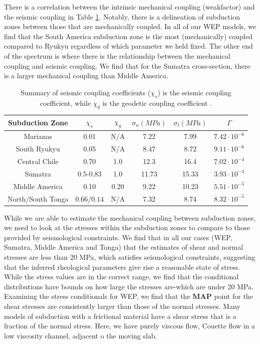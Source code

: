 \documentclass[12pt]{article}
\begin{document}
{There is a correlation between the intrinsic mechanical coupling (weakfactor) and the seismic coupling in Table \ref{table:coupling_summary}. Notably, there is a delineation of subduction zones between those that are mechanically coupled. In all of our WEP models, we find that the South America subduction zone is the most (mechanically) coupled compared to Ryukyu regardless of which parameter we held fixed. The other end of the spectrum is where there is the relationship between the mechanical coupling and seismic coupling. We find that for the Sumatra cross-section, there is a larger mechanical coupling than Middle America.
   
   \begin{table}[H]
  \caption{Summary of seismic coupling coefficients ($\chi_s$) is the seismic coupling coefficient, while $\chi_g$ is the geodetic coupling coefficient \citep{scholz2012seismic}.} %
  \centering  %
  \begin{tabular}{c c c c c c} %
    \hline \hline                        %
    Subduction Zone & $\chi_s$ & $\chi_g$ & $\sigma_n (MPa)$ & $\sigma_t (MPa)$ & $\Gamma$ \\ [0.5ex] %
    \hline                  %
    Marianas &0.01 &N/A &7.22 &7.99 & $7.42 \cdot 10^{-6}$\\
    South Ryukyu  &0.05 &N/A &8.47&8.72 & $9.11 \cdot 10^{-6}$\\
    Central Chile &0.70 &1.0 &12.3 &16.4 & $7.02 \cdot 10^{-4}$ \\
    Sumatra &0.5-0.83 &1.0 &11.73 & 15.33 &$3.93 \cdot 10^{-4}$\\
    Middle America &0.10 &0.20 &9.22 & 10.23 & $5.51 \cdot 10^{-5}$ \\
    North$/$South Tonga & $0.66/0.14$ &N/A &7.32 & 8.74 & $8.32 \cdot 10^{-5}$ \\
    \hline %
  \end{tabular}
  \label{table:coupling_summary} %
\end{table}

   
   While we are able to estimate the mechanical coupling between subduction zones, we need to look at the stresses within the subduction zones to compare to those provided by seismological constraints. We find that in all our cases (WEP, Sumatra, Middle America and Tonga) that the estimates of shear and normal stresses are less than 20 MPa, which satisfies seismological constraints, suggesting that the inferred rheological parameters give rise a reasonable state of stress. While the stress values are in the correct range, we find that the conditional distributions have bounds on how large the stresses are-which are under 20 MPa. Examining the stress conditionals for WEP, we find that the \textbf{MAP} point for the shear stresses are consistently larger than those of the normal stresses. 
Many models of subduction with a frictional material have a shear stress that is a fraction of the normal stress.
Here, we have purely viscous flow, Couette flow in a low viscosity  channel, adjacent o the  moving slab.
   
}
\end{document}
